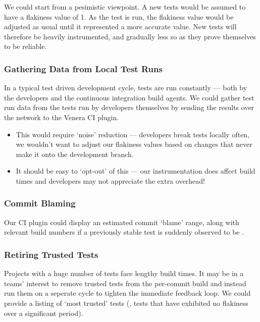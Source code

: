 We could start from a pesimistic viewpoint. A new tests would be assumed to have
a flakiness value of 1. As the test is run, the flakiness value would be
adjusted as usual until it represented a more accurate value. New tests will
therefore be heavily instrumented, and gradually less so as they prove
themselves to be reliable.

\subsubsection{Gathering Data from Local Test Runs}

In a typical test driven development cycle, tests are run constantly --- both by
the developers and the continuous integration build agents. We could gather test
run data from the tests run by developers themselves by sending the results over
the network to the Venera CI plugin.

\begin{itemize}
	\item This would require {\lq}noise{\rq} reduction --- developers break tests
	locally often, we wouldn't want to adjust our flakiness values based on
	changes that never make it onto the development branch.
	\item It should be easy to {\lq}opt-out{\rq} of this --- our instrumentation
	does affect build times and developers may not appreciate the extra overhead!
\end{itemize}

\subsubsection{Commit Blaming}

Our CI plugin could display an estimated commit {\lq}blame{\rq} range, along
with relevant build numbers if a previously stable test is suddenly observed to
be \flaky.

\subsubsection{Retiring Trusted Tests}

Projects with a huge number of tests face lengthy build times. It may be in a
teams' interest to remove trusted tests from the per-commit build and instead
run them on a seperate cycle to tighten the immediate feedback loop. We could
provide a listing of {\lq}most trusted{\rq} tests (\ie, tests that have
exhibited no flakiness over a significant period).

